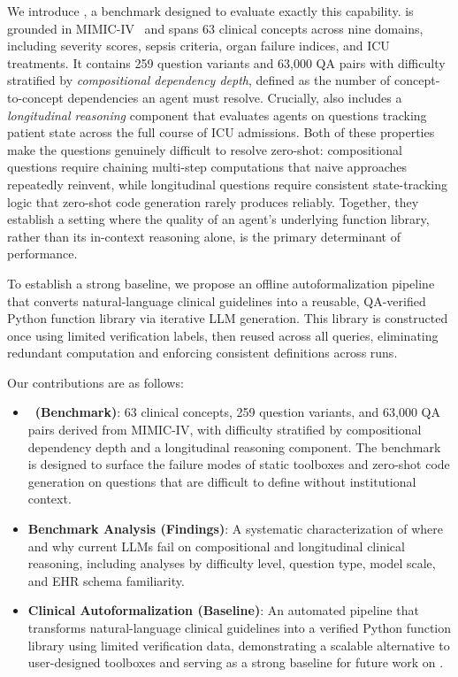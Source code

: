 We introduce \textbf{\ours{}}, a benchmark designed to evaluate exactly this capability. \ours{} is grounded in MIMIC-IV~\cite{johnson2020mimic} and spans 63 clinical concepts across nine domains, including severity scores, sepsis criteria, organ failure indices, and ICU treatments. It contains 259 question variants and 63{,}000 QA pairs with difficulty stratified by \emph{compositional dependency depth}, defined as the number of concept-to-concept dependencies an agent must resolve. Crucially, \ours{} also includes a \emph{longitudinal reasoning} component that evaluates agents on questions tracking patient state across the full course of ICU admissions.  Both of these properties make the questions genuinely difficult to resolve zero-shot: compositional questions require chaining multi-step computations that naive approaches repeatedly reinvent, while longitudinal questions require consistent state-tracking logic that zero-shot code generation rarely produces reliably. Together, they establish a setting where the quality of an agent's underlying function library, rather than its in-context reasoning alone, is the primary determinant of performance.

To establish a strong baseline, we propose an offline autoformalization pipeline that converts natural-language clinical guidelines into a reusable, QA-verified Python function library via iterative LLM generation. This library is constructed once using limited verification labels, then reused across all queries, eliminating redundant computation and enforcing consistent definitions across runs.

Our contributions are as follows:
\begin{itemize}
\item \textbf{\ours\ (Benchmark)}: 63 clinical concepts, 259 question variants, and 63{,}000 QA pairs derived from MIMIC-IV, with difficulty stratified by compositional dependency depth and a longitudinal reasoning component. The benchmark is designed to surface the failure modes of static toolboxes and zero-shot code generation on questions that are difficult to define without institutional context.
\item \textbf{Benchmark Analysis (Findings)}: A systematic characterization of where and why current LLMs fail on compositional and longitudinal clinical reasoning, including analyses by difficulty level, question type, model scale, and EHR schema familiarity.
\item \textbf{Clinical Autoformalization (Baseline)}: An automated pipeline that transforms natural-language clinical guidelines into a verified Python function library using limited verification data, demonstrating a scalable alternative to user-designed toolboxes and serving as a strong baseline for future work on \ours{}.
\end{itemize}
